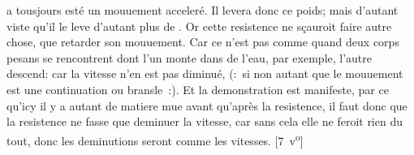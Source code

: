 a tousjours est\'{e} un mouuement acceler\'{e}.
Il levera donc ce poids; mais d'autant
viste qu'il le leve d'autant plus de
.
Or cette resistence ne s\c{c}auroit faire autre chose, que retarder son mouuement.
Car ce n'est pas comme quand deux corps pesans se rencontrent dont l'un monte dans de l'eau, par exemple, l'autre descend:
car la vitesse\protect{} n'en est pas diminu\'{e},
(:~si non autant que le mouuement est une continuation ou bransle~:).
Et la demonstration est manifeste, par ce qu'icy il y a autant de matiere mue avant qu'apr\`{e}s la resistence,
il faut donc que la resistence ne fasse que deminuer la vitesse,
car sans cela elle ne feroit rien du tout, donc les deminutions seront comme les vitesses. [7~v\textsuperscript{o}]
\pend
\pstart
\vspace{1em}%